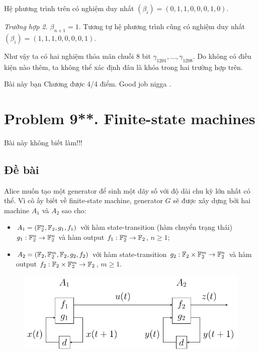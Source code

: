 Hệ phương trình trên có nghiệm duy nhất $(\beta_{i}) = (0, 1, 1, 0, 0, 0, 1, 0)$.

\textit{Trường hợp 2.} $\beta_{n+1} = 1$. Tương tự hệ phương trình cũng có nghiệm duy nhất $(\beta_i) = (1, 1, 1, 0, 0, 0, 0, 1)$.

Như vậy ta có hai nghiệm thỏa mãn chuỗi 8 bit $\gamma_{1201}, \ldots, \gamma_{1208}$. Do không có điều kiện nào thêm, ta không thể xác định đâu là khóa trong hai trường hợp trên.

Bài này bạn Chương được 4/4 điểm. Good job nigga .

\section*{Problem 9**. Finite-state machines}

Bài này không biết làm!!!

\subsection*{Đề bài}

Alice muốn tạo một generator để sinh một dãy số với độ dài chu kỳ lớn nhất có thể. Vì cô ấy biết về finite-state machine, generator $G$ sẽ được xây dựng bởi hai machine $A_1$ và $A_2$ sao cho:

\begin{itemize}
    \item $A_1 = (\mathbb{F}_2^n, \mathbb{F}_2, g_1, f_1)$ với hàm state-transition (hàm chuyển trạng thái) $g_1 : \mathbb{F}_2^n \to \mathbb{F}_2^n$ và hàm output $f_1: \mathbb{F}_2^n \to \mathbb{F}_2$, $n \geqslant 1$;
    \item $A_2 = (\mathbb{F}_2, \mathbb{F}_2^m, \mathbb{F}_2, g_2, f_2)$ với hàm state-transition $g_2 : \mathbb{F}_2 \times \mathbb{F}_2^m \to \mathbb{F}_2^n$ và hàm output $f_2 : \mathbb{F}_2 \times \mathbb{F}_2^m \to \mathbb{F}_2$, $m \geqslant 1$.
\end{itemize}

\begin{figure}[ht]
    \centering
    \includegraphics[page=1]{nsucrypto/2023/problem9_figures.pdf}
\end{figure}

